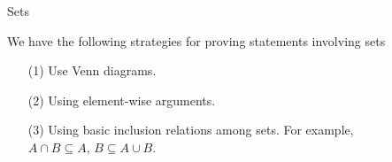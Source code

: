 \vspace*{2em}

\begin{mdframed}
\begin{center}
{\Large Sets}
\end{center}
\end{mdframed}

\begin{discussion}
We have the following strategies for proving statements involving sets
\begin{itemize}
\item[(1)] Use Venn diagrams.
\item[(2)] Using element-wise arguments.
\item[(3)] Using basic inclusion relations among sets. For example, $A \cap B \subseteq A,\,B \subseteq A \cup B$.
\end{itemize}
\end{discussion}

\vspace*{1em}

